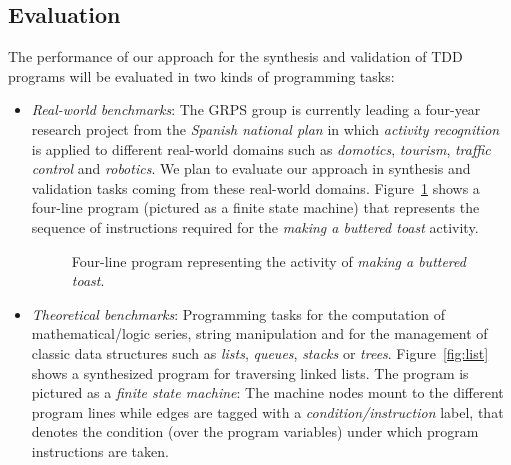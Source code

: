 \documentclass[10pt,a4paper]{paper}
\begin{document}
\subsection{Evaluation}
The performance of our approach for the synthesis and validation of TDD programs will be evaluated in two kinds of programming tasks:
\begin{itemize}
\item {\em Real-world benchmarks}: The GRPS group is currently leading a four-year research project from the {\em Spanish national plan} in which {\em activity recognition} is applied to different real-world domains such as {\em domotics}, {\em tourism}, {\em traffic control} and {\em robotics}. We plan to evaluate our approach in synthesis and validation tasks coming from these real-world domains. Figure~\ref{fig:activity} shows a four-line program (pictured as a finite state machine) that represents the sequence of instructions required for the {\em making a buttered toast} activity. 

\begin{figure}[hbt!]
\begin{center}
\end{center}
\caption{\small Four-line program representing the activity of {\em making a buttered toast}.}
\label{fig:activity}
\end{figure}


\item {\em Theoretical benchmarks}: Programming tasks for the computation of mathematical/logic series, string manipulation and for the management of classic data structures such as {\em lists}, {\em queues}, {\em stacks} or {\em trees}. Figure~\ref{fig:list} shows a synthesized program for traversing linked lists. The program is pictured as a {\em finite state machine}: The machine nodes mount to the different program lines while edges are tagged with a {\em condition/instruction} label, that denotes the condition (over the program variables) under which program instructions are taken.  
\end{itemize}
\end{document}
